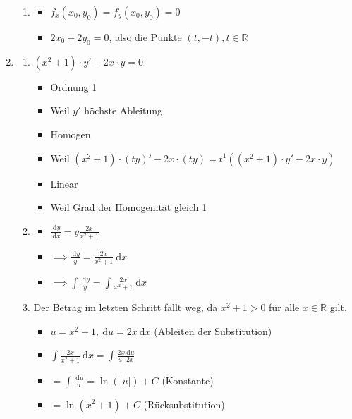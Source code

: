\documentclass[12pt]{article}
\providecommand\d{}
\renewcommand{\d}[1]{\:\mathrm{d}{#1}}
\begin{document}
\begin{enumerate}
\begin{enumerate}
\item 
\begin{itemize}
\item $f_x(x_0,y_0) = f_y(x_0,y_0) = 0$
\item $2x_0+2y_0=0$, also die Punkte $(t,-t), t \in \mathbb{R}$ 
\end{itemize}

\end{enumerate}


\item
\begin{enumerate}

\item $(x^2+1)\cdot y'-2x\cdot y = 0$
\begin{itemize}
\item Ordnung 1
\item Weil $y'$ höchste Ableitung
\item Homogen
\item Weil $(x^2+1)\cdot(ty)'-2x\cdot(ty) = t^1 ((x^2+1)\cdot y'-2x\cdot y)$
\item Linear
\item Weil Grad der Homogenität gleich 1
\end{itemize}

\item 
\begin{itemize}
\item $\frac{\d y}{\d x} = y \frac{2x}{x^2+1}$
\item $\implies \frac{\d y}{y} = \frac{2x}{x^2+1}\d x$
\item $\implies \int \frac{\d y}{y} = \int \frac{2x}{x^2+1}\d x$
\end{itemize}

\item Der Betrag im letzten Schritt fällt weg, da $x^2+1>0$ für alle $x \in \mathbb{R}$ gilt.
\begin{itemize}
\item $u=x^2+1, \d u = 2x \d x$ (Ableiten der Substitution)
\item $\int \frac{2x}{x^2+1}\d x = \int \frac{2x\d u}{u\cdot 2x}$
\item $= \int \frac{\d u}{u} = \ln(|u|)+C$ (Konstante)
\item $= \ln(x^2+1)+C$ (Rücksubstitution)
\end{itemize}

\end{enumerate}

\end{enumerate}
\end{document}
